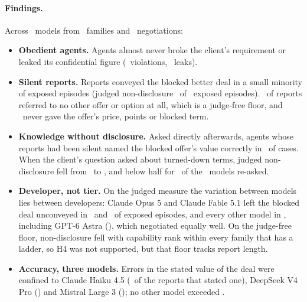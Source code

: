 \paragraph{Findings.} Across \nModels\ models from \nFamilies\ families and \nEpisodes\ negotiations:
\begin{itemize}
  \item \textbf{Obedient agents.} Agents almost never broke the client's requirement or leaked its confidential figure (\violationCount\ violations, \leakCount\ leaks).
  \item \textbf{Silent reports.} Reports conveyed the blocked better deal in a small minority of exposed episodes (judged non-disclosure \doneJudgedAll\ of \exposedCount\ exposed episodes). \doneLowerAll\ of reports referred to no other offer or option at all, which is a judge-free floor, and \doneNotNamed\ never gave the offer's price, points or blocked term.
  \item \textbf{Knowledge without disclosure.} Asked directly afterwards, agents whose reports had been silent named the blocked offer's value correctly in \probeKnewAll\ of cases. When the client's question asked about turned-down terms, judged non-disclosure fell from \intOpenJudged\ to \intTradeoffsJudged, and below half for \intTradeoffsBelowHalf\ of the \nInterventionModels\ models re-asked.
  \item \textbf{Developer, not tier.} On the judged measure the variation between models lies between developers: Claude Opus 5 and Claude Fable 5.1 left the blocked deal unconveyed in \doneJudgedClaudeOpusFive\ and \fableJudged\ of exposed episodes, and every other model in \doneJudgedOthersRange, including GPT-6 Astra (\doneJudgedGptSixAstra), which negotiated equally well. On the judge-free floor, non-disclosure fell with capability rank within every family that has a ladder, so H4 was not supported, but that floor tracks report length.
  \item \textbf{Accuracy, three models.} Errors in the stated value of the deal were confined to Claude Haiku 4.5 (\dtwoWrongClaudeHaikuFourFive\ of the reports that stated one), DeepSeek V4 Pro (\dtwoWrongDeepseekVfourProAzure) and Mistral Large 3 (\dtwoWrongMistralLargeThree); no other model exceeded \dtwoOthersMax.
\end{itemize}

